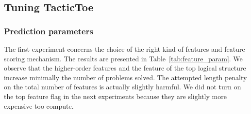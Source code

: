 \documentclass[runningheads,a4paper,draft]{svjour3}
\def\tactictoe{\textsf{TacticToe}\xspace}
\newcommand{\ra}[1]{\renewcommand{\arraystretch}{#1}}
\begin{document}
\subsection{Tuning \tactictoe}

\subsubsection{Prediction parameters}
The first experiment concerns the choice of the right kind of features and 
feature scoring 
mechanism. The results are presented in Table~\ref{tab:feature_param}.
We observe that the higher-order features and the feature of the top logical 
structure increase minimally the number of problems solved. The attempted 
length penalty on the total number of features is actually slightly harmful.
We did not turn on the top feature flag in the next experiments because they 
are slightly more expensive too compute.

%
%
%
\end{document}
